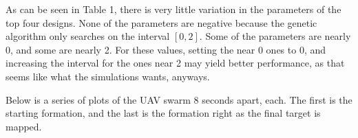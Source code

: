\documentclass[a4paper,12pt]{report}
\begin{document}
\begin{table}[H]
\caption{Design Parameters and Cost of the Best Designs}
\end{table}

\noindent
As can be seen in Table 1, there is very little variation in the parameters of the top four designs. None of the parameters are negative because the genetic algorithm only searches on the interval $[0, 2]$. Some of the parameters are nearly 0, and some are nearly 2. For these values, setting the near 0 ones to 0, and increasing the interval for the ones near 2 may yield better performance, as that seems like what the simulations wants, anyways.

\pagebreak
Below is a series of plots of the UAV swarm 8 seconds apart, each. The first is the starting formation, and the last is the formation right as the final target is mapped.
\end{document}
